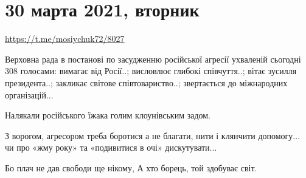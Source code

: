  
 
 
 
 
\section{30 марта 2021, вторник}
\label{sec:30_03_2021}

\url{https://t.me/mosiychuk72/8027}

Верховна рада в постанові по засудженню російської агресії ухваленій сьогодні
308 голосами: вимагає від Росії..; висловлює глибокі співчуття..; вітає зусилля
президента..; закликає світове співтовариство..; звертається до міжнародних
організацій...

Налякали російського їжака голим клоунівським задом.

З ворогом, агресором треба боротися а не благати, нити і клянчити допомогу...
чи про «жму року» та «подивитися в очі» дискутувати...

Бо плач не дав свободи ще нікому, А хто борець, той здобуває світ.

